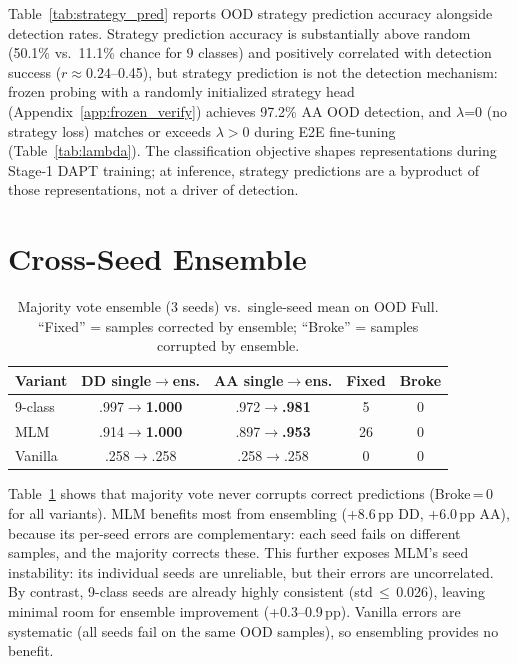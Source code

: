 Table~\ref{tab:strategy_pred} reports OOD strategy prediction accuracy alongside detection rates. Strategy prediction accuracy is substantially above random (50.1\% vs.\ 11.1\% chance for 9 classes) and positively correlated with detection success ($r \approx 0.24$--0.45), but strategy prediction is not the detection mechanism: frozen probing with a randomly initialized strategy head (Appendix~\ref{app:frozen_verify}) achieves 97.2\% AA OOD detection, and $\lambda$=0 (no strategy loss) matches or exceeds $\lambda > 0$ during E2E fine-tuning (Table~\ref{tab:lambda}). The classification objective shapes representations during Stage-1 DAPT training; at inference, strategy predictions are a byproduct of those representations, not a driver of detection.

\section{Cross-Seed Ensemble}
\label{app:ensemble}

\begin{table}[ht]
\centering
\footnotesize
\caption{Majority vote ensemble (3 seeds) vs.\ single-seed mean on OOD Full. ``Fixed'' = samples corrected by ensemble; ``Broke'' = samples corrupted by ensemble.}
\label{tab:ensemble}
\begin{tabular}{@{}lcccc@{}}
\toprule
\textbf{Variant} & DD single$\to$ens. & AA single$\to$ens. & Fixed & Broke \\
\midrule
9-class & .997$\to$\textbf{1.000} & .972$\to$\textbf{.981} & 5 & 0 \\
MLM & .914$\to$\textbf{1.000} & .897$\to$\textbf{.953} & 26 & 0 \\
Vanilla & .258$\to$.258 & .258$\to$.258 & 0 & 0 \\
\bottomrule
\end{tabular}
\end{table}

Table~\ref{tab:ensemble} shows that majority vote never corrupts correct predictions (Broke\,=\,0 for all variants). MLM benefits most from ensembling (+8.6\,pp DD, +6.0\,pp AA), because its per-seed errors are complementary: each seed fails on different samples, and the majority corrects these. This further exposes MLM's seed instability: its individual seeds are unreliable, but their errors are uncorrelated. By contrast, 9-class seeds are already highly consistent (std\,$\leq$\,0.026), leaving minimal room for ensemble improvement (+0.3--0.9\,pp). Vanilla errors are systematic (all seeds fail on the same OOD samples), so ensembling provides no benefit.

